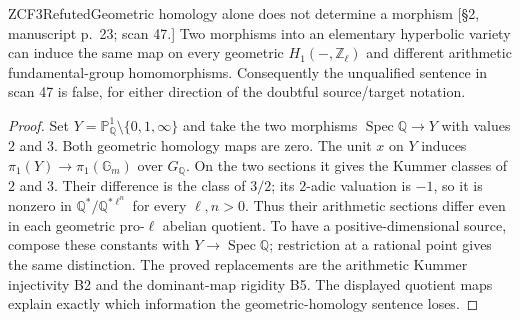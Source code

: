 \begin{result}{ZCF3}{Refuted}{Geometric homology alone does not determine a morphism}
\textup{[\S2, manuscript p.\ 23; scan 47.]}
Two morphisms into an elementary hyperbolic variety can induce the
same map on every geometric $H_1(-,\mathbb Z_\ell)$ and different
arithmetic fundamental-group homomorphisms. Consequently the
unqualified sentence in scan 47 is false, for either direction of
the doubtful source/target notation.
\end{result}
\begin{proof}
Set $Y=\mathbb P^1_{\mathbb Q}\setminus\{0,1,\infty\}$ and take
the two morphisms $\operatorname{Spec}\mathbb Q\to Y$ with values
$2$ and $3$. Both geometric homology maps are zero. The unit $x$ on
$Y$ induces $\pi_1(Y)\to\pi_1(\mathbb G_m)$ over $G_{\mathbb Q}$.
On the two sections it gives the Kummer classes of $2$ and $3$.
Their difference is the class of $3/2$; its $2$-adic valuation is
$-1$, so it is nonzero in
$\mathbb Q^*/\mathbb Q^{*\ell^n}$ for every $\ell,n>0$.
Thus their arithmetic sections differ even in each geometric
pro-$\ell$ abelian quotient. To have a positive-dimensional source,
compose these constants with $Y\to\operatorname{Spec}\mathbb Q$;
restriction at a rational point gives the same distinction.
The proved replacements are the arithmetic Kummer injectivity B2
and the dominant-map rigidity B5. The displayed quotient maps explain
exactly which information the geometric-homology sentence loses.
\end{proof}

